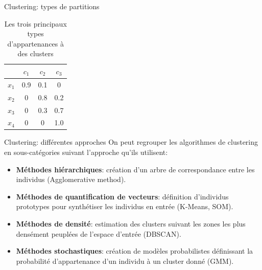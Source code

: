 \documentclass[hyperref={pdfpagelabels=false}]{beamer}
\begin{document}
\begin{frame}{Clustering: types de partitions}
\begin{table}[htbp]
\begin{subtable}{.3\textwidth}
\begin{tabular}{|c|c|c|c|}
                          & $c_1$       & $c_2$ & $c_3$ \\
                    \hline
                    \hline
                    $x_1$   & 0.9    &  0.1       &  0 \\
                    $x_2$   & 0    &  0.8       &  0.2 \\
                    $x_3$   & 0    &  0.3       &  0.7 \\
                    $x_4$   & 0    &  0       &  1.0 \\
                    \hline
                \end{tabular}
                \caption{Clustering flou}
            \end{subtable}
            \caption{Les trois principaux types d'appartenances à des clusters}
        \end{table}
    \end{frame}

    \begin{frame}{Clustering: différentes approches}
        On peut regrouper les algorithmes de clustering en sous-catégories 
        suivant l'approche qu'ils utilisent:
        \begin{itemize}
            \item {\textbf{Méthodes hiérarchiques}: 
                    création d'un arbre de correspondance entre les individus 
                (Agglomerative method).}
            \item \textbf{Méthodes de quantification de vecteurs}: définition 
            d'individus prototypes pour synthétiser les individus en entrée 
            (K-Means, SOM).
            \item {\textbf{Méthodes de densité}: 
                    estimation des clusters suivant les zones les plus densément 
                peuplées de l'espace d'entrée (DBSCAN).}
            \item {\textbf{Méthodes stochastiques}: 
                    création de modèles probabilistes définissant la probabilité 
                d'appartenance d'un individu à un cluster donné (GMM).}
        \end{itemize}
    \end{frame}
\end{document}
